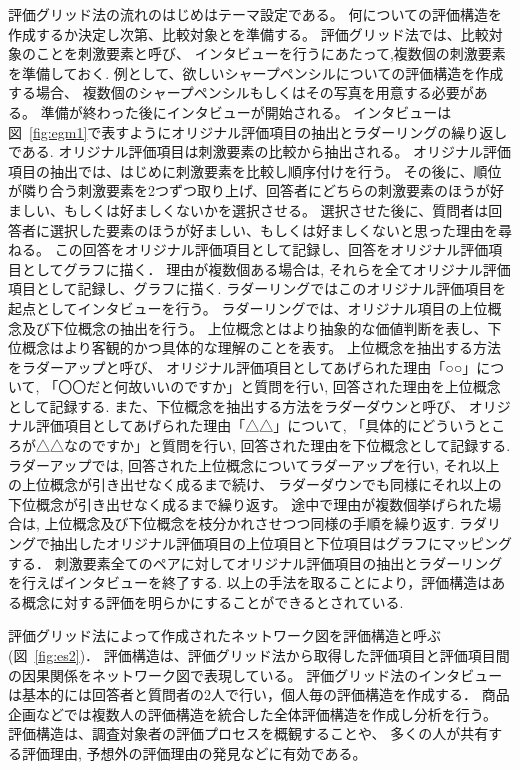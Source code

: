 \documentclass[syuuron]{kuee}
\begin{document}
		評価グリッド法の流れのはじめはテーマ設定である。
		何についての評価構造を作成するか決定し次第、比較対象とを準備する。
		評価グリッド法では、比較対象のことを刺激要素と呼び、
		インタビューを行うにあたって,複数個の刺激要素を準備しておく. 
		例として、欲しいシャープペンシルについての評価構造を作成する場合、
		複数個のシャープペンシルもしくはその写真を用意する必要がある。
		準備が終わった後にインタビューが開始される。
		インタビューは図~\ref{fig:egm1}で表すようにオリジナル評価項目の抽出とラダーリングの繰り返しである. 
		オリジナル評価項目は刺激要素の比較から抽出される。
		オリジナル評価項目の抽出では、はじめに刺激要素を比較し順序付けを行う。
		その後に、順位が隣り合う刺激要素を2つずつ取り上げ、回答者にどちらの刺激要素のほうが好ましい、もしくは好ましくないかを選択させる。
		選択させた後に、質問者は回答者に選択した要素のほうが好ましい、もしくは好ましくないと思った理由を尋ねる。
		この回答をオリジナル評価項目として記録し、回答をオリジナル評価項目としてグラフに描く．
		理由が複数個ある場合は, それらを全てオリジナル評価項目として記録し、グラフに描く. 
		ラダーリングではこのオリジナル評価項目を起点としてインタビューを行う。
		ラダーリングでは、オリジナル項目の上位概念及び下位概念の抽出を行う。
		上位概念とはより抽象的な価値判断を表し、下位概念はより客観的かつ具体的な理解のことを表す。
		上位概念を抽出する方法をラダーアップと呼び、
		オリジナル評価項目としてあげられた理由「○○」について, 「〇〇だと何故いいのですか」と質問を行い, 回答された理由を上位概念として記録する. 
		また、下位概念を抽出する方法をラダーダウンと呼び、
		オリジナル評価項目としてあげられた理由「△△」について, 「具体的にどういうところが△△なのですか」と質問を行い, 回答された理由を下位概念として記録する. 
		ラダーアップでは, 回答された上位概念についてラダーアップを行い, それ以上の上位概念が引き出せなく成るまで続け、
		ラダーダウンでも同様にそれ以上の下位概念が引き出せなく成るまで繰り返す。
		途中で理由が複数個挙げられた場合は, 上位概念及び下位概念を枝分かれさせつつ同様の手順を繰り返す. 
		ラダリングで抽出したオリジナル評価項目の上位項目と下位項目はグラフにマッピングする．
		刺激要素全てのペアに対してオリジナル評価項目の抽出とラダーリングを行えばインタビューを終了する. 
		以上の手法を取ることにより，評価構造はある概念に対する評価を明らかにすることができるとされている. 
		
		評価グリッド法によって作成されたネットワーク図を評価構造と呼ぶ(図~\ref{fig:es2})．
		評価構造は、評価グリッド法から取得した評価項目と評価項目間の因果関係をネットワーク図で表現している。
		評価グリッド法のインタビューは基本的には回答者と質問者の2人で行い，個人毎の評価構造を作成する．
		商品企画などでは複数人の評価構造を統合した全体評価構造を作成し分析を行う。
		評価構造は、調査対象者の評価プロセスを概観することや、
		多くの人が共有する評価理由, 予想外の評価理由の発見などに有効である。
		
\end{document}
